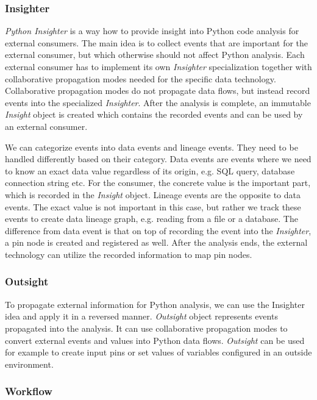 \subsubsection{Insighter}
\textit{Python Insighter} is a way how to provide insight into Python code analysis for external consumers. The main idea is to collect events that are important for the external consumer, but which otherwise should not affect Python analysis. Each external consumer has to implement its own \textit{Insighter} specialization together with collaborative propagation modes needed for the specific data technology. Collaborative propagation modes do not propagate data flows, but instead record events into the specialized \textit{Insighter}. After the analysis is complete, an immutable \textit{Insight} object is created which contains the recorded events and can be used by an external consumer.
\par
We can categorize events into data events and lineage events. They need to be handled differently based on their category. Data events are events where we need to know an exact data value regardless of its origin, e.g. SQL query, database connection string etc. For the consumer, the concrete value is the important part, which is recorded in the \textit{Insight} object. Lineage events are the opposite to data events. The exact value is not important in this case, but rather we track these events to create data lineage graph, e.g. reading from a file or a database. The difference from data event is that on top of recording the event into the \textit{Insighter}, a pin node is created and registered as well. After the analysis ends, the external technology can utilize the recorded information to map pin nodes.

\subsubsection{Outsight}

To propagate external information for Python analysis, we can use the Insighter idea and apply it in a reversed manner. \textit{Outsight} object represents events propagated into the analysis. It can use collaborative propagation modes to convert external events and values into Python data flows. \textit{Outsight} can be used for example to create input pins or set values of variables configured in an outside environment.

\subsubsection{Workflow}

